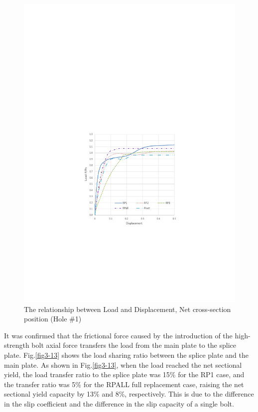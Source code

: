 \begin{figure}[htbp]
\begin{minipage}[t]{0.42\textwidth}
    \includegraphics[width=\linewidth]{imgs/ch3/fig3-12.pdf}
    \caption{The relationship between Load and Displacement, Net cross-section position (Hole \#1)}
    \label{fig3-12}  
    \end{minipage}
\end{figure}

It was confirmed that the frictional force caused by the introduction of the high-strength bolt axial force transfers the load from the main plate to the splice plate. Fig.\ref{fig3-13} shows the load sharing ratio between the splice plate and the main plate. As shown in Fig.\ref{fig3-13}, when the load reached the net sectional yield, the load transfer ratio to the splice plate was 15\% for the RP1 case, and the transfer ratio was 5\% for the RPALL full replacement case, raising the net sectional yield capacity by 13\% and 8\%, respectively. This is due to the difference in the slip coefficient and the difference in the slip capacity of a single bolt.

